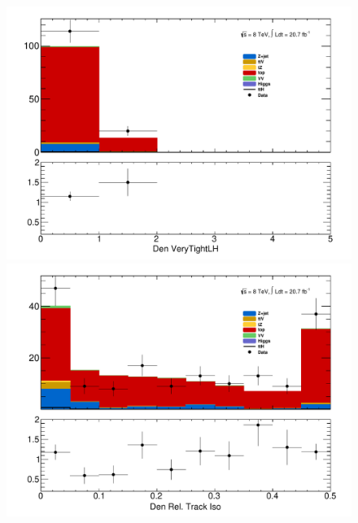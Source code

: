 \begin{figure}[!htbp]
  \begin{minipage}[h]{0.5\textwidth}
    \centering \includegraphics[width=\textwidth]{figs/fake/aux_d2_Obj0VeryTightLH}
  \end{minipage}\hfill
  \begin{minipage}[h]{0.5\textwidth}
    \centering \includegraphics[width=\textwidth]{figs/fake/aux_d1_Obj0PtIso20Rel}
  \end{minipage}\hfill
  \begin{minipage}[h]{0.5\textwidth}

\end{minipage}
\end{figure}
